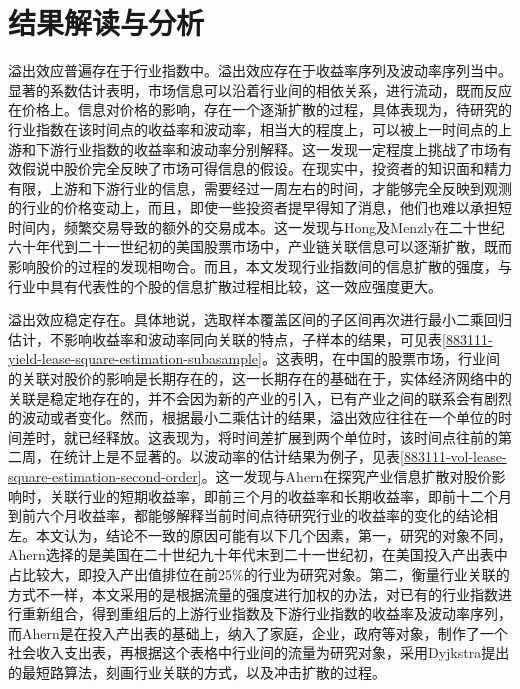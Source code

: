 \documentclass{sysuthesis}
\begin{document}
\section{结果解读与分析}
溢出效应普遍存在于行业指数中。溢出效应存在于收益率序列及波动率序列当中。显著的系数估计表明，市场信息可以沿着行业间的相依关系，进行流动，既而反应在价格上。信息对价格的影响，存在一个逐渐扩散的过程，具体表现为，待研究的行业指数在该时间点的收益率和波动率，相当大的程度上，可以被上一时间点的上游和下游行业指数的收益率和波动率分别解释。这一发现一定程度上挑战了市场有效假说中股价完全反映了市场可得信息的假设。在现实中，投资者的知识面和精力有限，上游和下游行业的信息，需要经过一周左右的时间，才能够完全反映到观测的行业的价格变动上，而且，即使一些投资者提早得知了消息，他们也难以承担短时间内，频繁交易导致的额外的交易成本。这一发现与Hong\cite{hong_industries_2002}及Menzly\cite{menzly_market_2010}在二十世纪六十年代到二十一世纪初的美国股票市场中，产业链关联信息可以逐渐扩散，既而影响股价的过程的发现相吻合。而且，本文发现行业指数间的信息扩散的强度，与行业中具有代表性的个股的信息扩散过程相比较，这一效应强度更大。

溢出效应稳定存在。具体地说，选取样本覆盖区间的子区间再次进行最小二乘回归估计，不影响收益率和波动率同向关联的特点，子样本的结果，可见表\ref{883111-yield-lease-square-estimation-subasample}。这表明，在中国的股票市场，行业间的关联对股价的影响是长期存在的，这一长期存在的基础在于，实体经济网络中的关联是稳定地存在的，并不会因为新的产业的引入，已有产业之间的联系会有剧烈的波动或者变化。然而，根据最小二乘估计的结果，溢出效应往往在一个单位的时间差时，就已经释放。这表现为，将时间差扩展到两个单位时，该时间点往前的第二周，在统计上是不显著的。以波动率的估计结果为例子，见表\ref{883111-vol-lease-square-estimation-second-order}。这一发现与Ahern\cite{ahern2013network}在探究产业信息扩散对股价影响时，关联行业的短期收益率，即前三个月的收益率和长期收益率，即前十二个月到前六个月收益率，都能够解释当前时间点待研究行业的收益率的变化的结论相左。本文认为，结论不一致的原因可能有以下几个因素，第一，研究的对象不同，Ahern选择的是美国在二十世纪九十年代末到二十一世纪初，在美国投入产出表中占比较大，即投入产出值排位在前25\%的行业为研究对象。第二，衡量行业关联的方式不一样，本文采用的是根据流量的强度进行加权的办法，对已有的行业指数进行重新组合，得到重组后的上游行业指数及下游行业指数的收益率及波动率序列，而Ahern是在投入产出表的基础上，纳入了家庭，企业，政府等对象，制作了一个社会收入支出表，再根据这个表格中行业间的流量为研究对象，采用Dyjkstra提出的最短路算法，刻画行业关联的方式，以及冲击扩散的过程。
\end{document}
